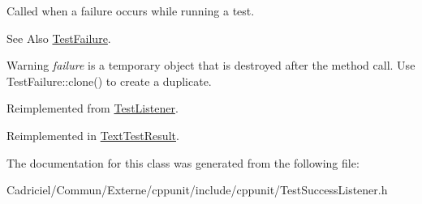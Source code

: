 Called when a failure occurs while running a test. 

\begin{DoxySeeAlso}{See Also}
\hyperlink{class_test_failure}{Test\-Failure}. 
\end{DoxySeeAlso}
\begin{DoxyWarning}{Warning}
{\itshape failure} is a temporary object that is destroyed after the method call. Use Test\-Failure\-::clone() to create a duplicate. 
\end{DoxyWarning}


Reimplemented from \hyperlink{class_test_listener_a103216a5814c907f7b752b969477e765}{Test\-Listener}.



Reimplemented in \hyperlink{class_text_test_result_a05d3b0e8e51b3430092166bbc3d17708}{Text\-Test\-Result}.



The documentation for this class was generated from the following file\-:\begin{DoxyCompactItemize}
\item 
Cadriciel/\-Commun/\-Externe/cppunit/include/cppunit/Test\-Success\-Listener.\-h\end{DoxyCompactItemize}
